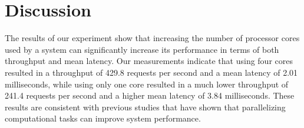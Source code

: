 \documentclass{article}
\begin{document}


             

        
\section{Discussion}
The results of our experiment show that increasing the number of processor cores used by a system can significantly increase its performance in terms of both throughput and mean latency. Our measurements indicate that using four cores resulted in a throughput of 429.8 requests per second and a mean latency of 2.01 milliseconds, while using only one core resulted in a much lower throughput of 241.4 requests per second and a higher mean latency of 3.84 milliseconds. These results are consistent with previous studies that have shown that parallelizing computational tasks can improve system performance.
\end{document}
